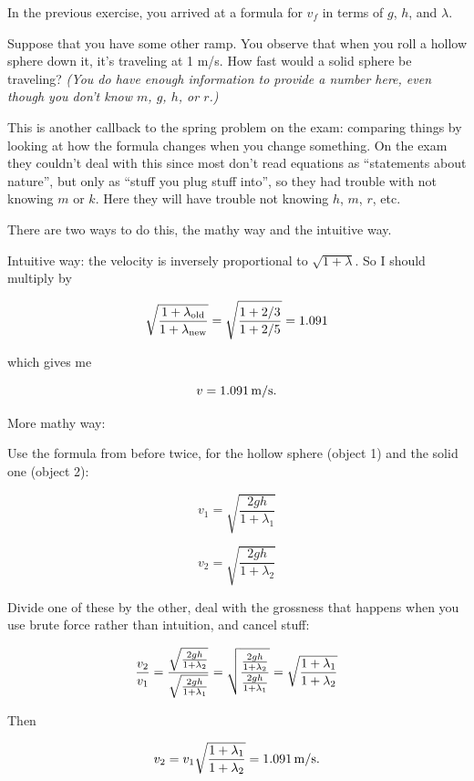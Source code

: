 \documentclass[12pt]{article}
\begin{document}
\begin{enumerate}
{\item In the previous exercise, you arrived at a formula for $v_f$ in terms of $g$, $h$, and $\lambda$.

\bigskip\bigskip

Suppose that you have some other ramp. You observe that when you roll a hollow sphere down it, it's traveling at 1 m/s. How fast would a solid sphere be traveling? \textit{(You do have enough information to provide a number here, even though you don't know $m$, $g$, $h$, or $r$.)}
}

   {\color{red} This is another callback to the spring problem on the exam: comparing things by looking at how the formula changes when you change something. On the exam they couldn't deal with this since most don't read equations as ``statements about nature'', but only as ``stuff you plug stuff into'', so they had trouble with not knowing $m$ or $k$. Here they will have trouble not knowing $h$, $m$, $r$, etc.
   	
   	There are two ways to do this, the mathy way and the intuitive way.
   	
   	Intuitive way: the velocity is inversely proportional to $\sqrt{1+\lambda}$. So I should multiply by 
   	
   	$$\sqrt \frac{1+\lambda_{\rm old}}{1+\lambda_{\rm new}} = \sqrt \frac {1+2/3}{ 1+2/5} = 1.091$$
   	
   	which gives me 
   	
   	$$v = 1.091 \, \rm m/\rm s.$$
   	
   	More mathy way:
   	
   	Use the formula from before twice, for the hollow sphere (object 1) and the solid one (object 2):

   	$$v_1 = \sqrt{\frac{2gh}{1 + \lambda_1}}$$
   	
	$$v_2 = \sqrt{\frac{2gh}{1 + \lambda_2}}$$
	
	Divide one of these by the other, deal with the grossness that happens when you use brute force rather than intuition, and cancel stuff:
	
		$$\frac{v_2}{v_1} = \frac{\sqrt{\frac{2gh}{1 + \lambda_2}}}{\sqrt{\frac{2gh}{1 + \lambda_1}}} =\sqrt \frac{{\frac{2gh}{1 + \lambda_2}}}{{\frac{2gh}{1 + \lambda_1}}} = \sqrt \frac{1+\lambda_{\rm 1}}{1+\lambda_{\rm 2}}$$
			
	Then
	
	$$v_2 = v_1 \sqrt \frac{1+\lambda_{\rm 1}}{1+\lambda_{\rm 2}} = 1.091 \, \rm m/\rm s.$$

   	
}

\end{enumerate}
\end{document}
